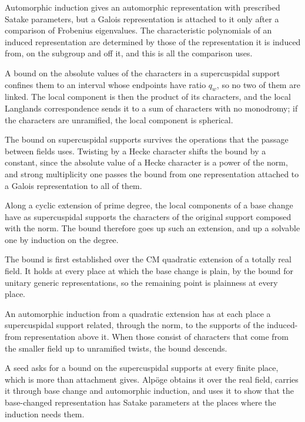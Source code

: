 Automorphic induction gives an automorphic representation with prescribed Satake parameters, but a Galois representation is attached to it only after a comparison of Frobenius eigenvalues. The characteristic polynomials of an induced representation are determined by those of the representation it is induced from, on the subgroup and off it, and this is all the comparison uses.

A bound on the absolute values of the characters in a supercuspidal support confines them to an interval whose endpoints have ratio $q_w$, so no two of them are linked. The local component is then the product of its characters, and the local Langlands correspondence sends it to a sum of characters with no monodromy; if the characters are unramified, the local component is spherical.

The bound on supercuspidal supports survives the operations that the passage between fields uses. Twisting by a Hecke character shifts the bound by a constant, since the absolute value of a Hecke character is a power of the norm, and strong multiplicity one passes the bound from one representation attached to a Galois representation to all of them.

Along a cyclic extension of prime degree, the local components of a base change have as supercuspidal supports the characters of the original support composed with the norm. The bound therefore goes up such an extension, and up a solvable one by induction on the degree.

The bound is first established over the CM quadratic extension of a totally real field. It holds at every place at which the base change is plain, by the bound for unitary generic representations, so the remaining point is plainness at every place.

An automorphic induction from a quadratic extension has at each place a supercuspidal support related, through the norm, to the supports of the induced-from representation above it. When those consist of characters that come from the smaller field up to unramified twists, the bound descends.

A seed asks for a bound on the supercuspidal supports at every finite place, which is more than attachment gives. Alpöge obtains it over the real field, carries it through base change and automorphic induction, and uses it to show that the base-changed representation has Satake parameters at the places where the induction needs them.

